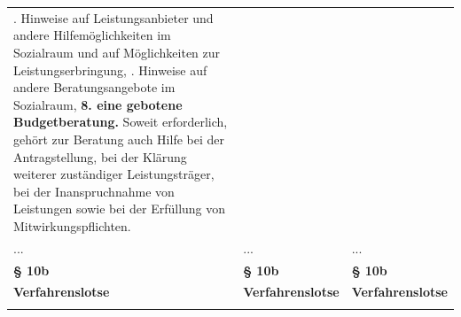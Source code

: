 \documentclass[10pt,a4paper,landscape]{article}
\begin{document}
\begin{longtable}{|L{8.2cm}|L{8.2cm}|L{8.2cm}|}
. Hinweise auf Leistungsanbieter und  \newline andere Hilfemöglichkeiten im Sozialraum  und auf Möglichkeiten zur  \newline Leistungserbringung,   . Hinweise auf andere Beratungsangebote  \newline im \textcolor{diffgreen}{Sozialraum,} \newline \textbf{\textcolor{diffgreen}{8. eine gebotene Budgetberatung.}} Soweit erforderlich, gehört zur Beratung  \newline auch Hilfe bei der Antragstellung, bei der  \newline Klärung weiterer zuständiger  \newline Leistungsträger, bei der Inanspruchnahme  \newline von Leistungen sowie bei der Erfüllung von  \newline Mitwirkungspflichten. \\
\hhline{|---|}
... & ... & ... \\
\hhline{|---|}
\textbf{\S{} 10b} & \textbf{\S{} 10b} & \textbf{\S{} 10b} \\
\hhline{|---|}
\textbf{Verfahrenslotse} & \textbf{Verfahrenslotse} & \textbf{Verfahrenslotse} \\
\hhline{|---|}

\end{longtable}
\end{document}
